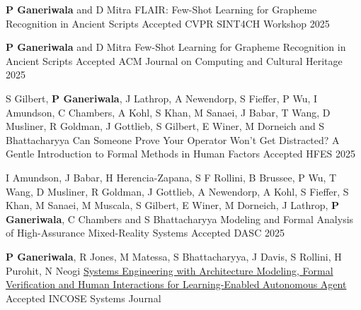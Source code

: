 \begin{cventries}
{ %
\begin{cvitems}
\end{cvitems}
}
\cventry
{\textbf{P Ganeriwala} and D Mitra}
{	
FLAIR: Few-Shot Learning for Grapheme Recognition in Ancient Scripts}
{Accepted}
{CVPR SINT4CH Workshop 2025} 
{ %
\begin{cvitems}
\end{cvitems}
}
\cventry
{\textbf{P Ganeriwala} and D Mitra}
{	
Few-Shot Learning for Grapheme Recognition in Ancient Scripts}
{Accepted}
{ACM Journal on Computing and Cultural Heritage 2025} 
{ %
\begin{cvitems}
\end{cvitems}
}
\cventry
{S Gilbert, \textbf{P Ganeriwala}, J Lathrop, A Newendorp, S Fieffer, P Wu, I Amundson, C Chambers, A Kohl,  S Khan, M Sanaei, J Babar, T Wang, D Musliner, R Goldman, J Gottlieb, S Gilbert, E Winer, M Dorneich and S Bhattacharyya}
{Can Someone Prove Your Operator Won’t Get Distracted? A Gentle Introduction to Formal Methods in Human Factors}
{Accepted}
{HFES 2025} 
{ %
\begin{cvitems}
\end{cvitems}
}
\cventry
{I Amundson, J Babar, H Herencia-Zapana, S F Rollini, B Brussee, P Wu, T Wang, D Musliner, R Goldman, J Gottlieb, A Newendorp, A Kohl, S Fieffer, S Khan, M Sanaei, M Muscala, S Gilbert, E Winer, M Dorneich, J Lathrop, \textbf{P Ganeriwala}, C Chambers and S Bhattacharyya}
{Modeling and Formal Analysis of High-Assurance Mixed-Reality Systems}
{Accepted}
{DASC 2025} 
{ %
\begin{cvitems}
\end{cvitems}
}
\cventry
{\textbf{P Ganeriwala}, R Jones, M Matessa, S Bhattacharyya, J Davis, S Rollini, H Purohit, N Neogi}
{\href{https://incose.onlinelibrary.wiley.com/doi/10.1002/sys.21816?af=R}{Systems Engineering with Architecture Modeling, Formal Verification and Human Interactions for Learning-Enabled Autonomous Agent}}
{Accepted}
{INCOSE Systems Journal} 
{ %
\begin{cvitems}

\end{cvitems}}
\end{cventries}
